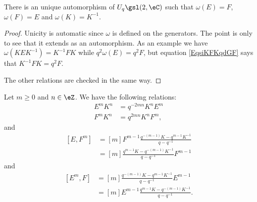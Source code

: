 \begin{lemma}
    There is an unique automorphism of \( U_q\gsl(2,\eC)\) such that \( \omega(E)=F\), \( \omega(F)=E\) and \( \omega(K)=K^{-1}\).
\end{lemma}

\begin{proof}
    Unicity is automatic since \( \omega\) is defined on the generators. The point is only to see that it extends as an automorphism. As an example we have \( \omega(KEK^{-1})=K^{-1}FK\) while \( q^2\omega(E)=q^2F\), but equation \eqref{EqsiKFKqdGF} says that \( K^{-1}FK=q^2F\).

    The other relations are checked in the same way.
\end{proof}

\begin{lemma}
    Let \( m\geq 0\) and \( n\in\eZ\). We have the following relations:
    \begin{subequations}
        \begin{align}
            E^mK^n&=q^{-2mn}K^nE^m     \label{EqComUqslEmKn}\\
            F^mK^n&=q^{2mn}K^nF^m,
        \end{align}
    \end{subequations}
    and
    \begin{subequations}
        \begin{align}
            [E,F^m]&=[m]F^{m-1}\frac{ q^{-(m-1)}K-q^{m-1}K^{-1} }{ q-q^{-1} }       \label{EqComUqslEFm}\\
            &=[m]\frac{ q^{m-1}K-q^{-(m-1)}K^{-1} }{ q-q^{-1} }F^{m-1}      \label{EqComUqslEFmb}
        \end{align}
    \end{subequations}
    and
    \begin{subequations}
        \begin{align}
            [E^m,F]&=[m]\frac{ q^{-(m-1)}K-q^{m-1}K^{-1} }{ q-q^{-1} }E^{m-1}\\
            &=[m]E^{m-1}\frac{ q^{m-1}K-q^{-(m-1)}K^{-1} }{ q-q^{-1} }.
        \end{align}
    \end{subequations}
\end{lemma}

